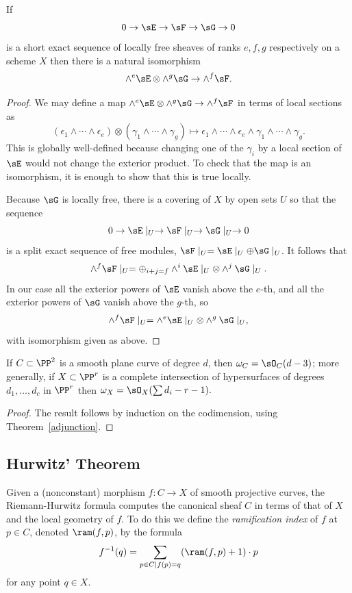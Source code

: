 \begin{lemma}\label{exterior powers}
 If 
$$
0\to \sE \to \sF\to \sG \to 0
$$
is a short exact sequence of locally free sheaves of ranks $e,f,g$ respectively on a scheme $X$ then there is a natural
isomorphism 
$$
\wedge^e\sE \otimes \wedge^g \sG \to \wedge^f\sF.
$$
\end{lemma}

\begin{proof}
 We may define a map
$
\wedge^e\sE \otimes \wedge^g \sG \to \wedge^f\sF
$
in terms of local sections as
$$
(\epsilon_1\wedge\cdots \wedge \epsilon_e) \otimes (\gamma_1\wedge\cdots\wedge \gamma_g)
\mapsto \epsilon_1\wedge\cdots \wedge \epsilon_e\wedge\gamma_1\wedge\cdots\wedge \gamma_g.
$$
This is globally well-defined because changing one of the $\gamma_i$ by a local section of $\sE$ would not
change the exterior product.
To check that the map is an isomorphism, it is enough to show that this is true locally.

Because $\sG$ is locally free, there is a covering of $X$ by open sets $U$
so that the sequence
$$
0\to \sE\mid_U \to \sF\mid_U\to \sG\mid_U \to 0
$$
is a split exact sequence of free modules, $\sF\mid_U = \sE\mid_U\oplus \sG\mid_U$.
It follows that
$$
\wedge^f\sF\mid_U = \oplus_{i+j = f} \wedge^i \sE\mid_U \otimes \wedge^j\sG\mid_U.
$$
In our case all the exterior powers of $\sE$ vanish above the $e$-th, and all the 
exterior powers of $\sG$ vanish above the $g$-th, so 
$$
\wedge^f\sF\mid_U =  \wedge^e \sE\mid_U \otimes \wedge^g\sG\mid_U,
$$
with isomorphism given as above.
\end{proof}


\begin{corollary}\label{canonical of plane curve}
If $C\subset \PP^{2}$ is a smooth plane curve of degree $d$, then $\omega_{C} = \sO_{C}(d-3)$; more generally, if
$X\subset \PP^{r}$ is a complete intersection of hypersurfaces of degrees $d_{1},\dots, d_{c}$ in $\PP^r$ then
$\omega_{X} = \sO_{X}(\sum d_{i }-r-1).$
\end{corollary}

\begin{proof}
The result follows by induction on the codimension, using Theorem~\ref{adjunction}.
\end{proof}

\subsection{Hurwitz' Theorem}
 Given a (nonconstant) morphism $f : C \to X$ of smooth projective curves, the Riemann-Hurwitz formula computes the canonical sheaf  $C$ in terms of that of  $X$ and the local geometry of $f$. To do this we define the
\emph{ramification index} of $f$ at $p \in C$,  denoted $\ram(f,p)$, 
by the formula 
$$
 f^{-1}(q) = \sum_{p\in C \mid f(p)=q} (\ram(f,p)+1)\cdot p
 $$
 for any point $q \in X$. 

